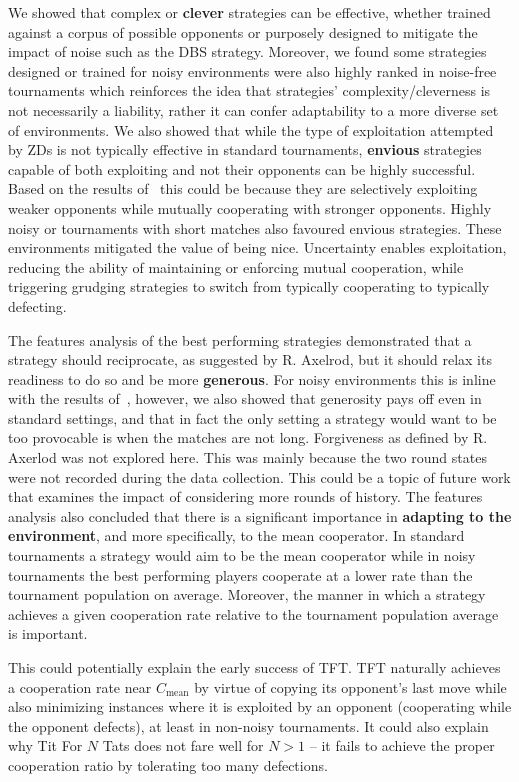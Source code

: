 We showed that complex or \textbf{clever} strategies can be effective, whether
trained against a corpus of possible opponents or purposely designed to mitigate
the impact of noise such as the DBS strategy. Moreover, we found some
strategies designed or trained for noisy environments were also highly ranked in
noise-free tournaments which reinforces the idea that strategies'
complexity/cleverness is not necessarily a liability, rather it can confer
adaptability to a more diverse set of environments.
We also showed that while the type of exploitation attempted by ZDs is
not typically effective in standard tournaments, \textbf{envious} strategies
capable of both exploiting and not their opponents can be highly successful.
Based on the results of~\cite{Harper2017} this could be because they are
selectively exploiting weaker opponents while mutually cooperating with stronger
opponents. Highly noisy or tournaments with short matches also favoured envious
strategies. These environments mitigated the value of being nice. Uncertainty
enables exploitation, reducing the ability of maintaining or enforcing mutual
cooperation, while triggering grudging strategies to switch from typically
cooperating to typically defecting.

The features analysis of the best performing strategies demonstrated that a
strategy should reciprocate, as suggested by R. Axelrod, but it should relax its
readiness to do so and be more \textbf{generous}. For noisy environments this is
inline with the results of~\cite{Bendor1991, Donninger1986, Molander1985,
Hammerstein1984}, however, we also showed that generosity pays off even in
standard settings, and that in fact the only setting a strategy would want to be
too provocable is when the matches are not long. Forgiveness as defined by R.
Axerlod was not explored here. This was mainly because the two round states were
not recorded during the data collection. This could be a topic of future work
that examines the impact of considering more rounds of history.
The features analysis also concluded that
there is a significant importance in \textbf{adapting to the environment}, and
more specifically, to the mean cooperator. 
In standard tournaments a strategy would aim to be the
mean cooperator while in noisy tournaments the best performing players
cooperate at a lower rate than the tournament population on average.
Moreover, the manner in which a
strategy achieves a given cooperation rate relative to the tournament population
average is important.

This could potentially explain the early success of TFT. TFT naturally achieves
a cooperation rate near $C_{\text{mean}}$ by virtue of copying its opponent's
last move while also minimizing instances where it is exploited by an opponent
(cooperating while the opponent defects), at least in non-noisy tournaments. It
could also explain why Tit For \(N\) Tats does not fare well for $N > 1$ -- it
fails to achieve the proper cooperation ratio by tolerating too many defections.

